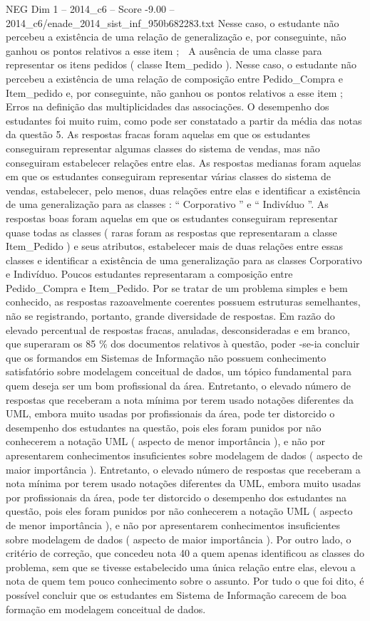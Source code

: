 \begin{textsample}{NEG Dim 1 – 2014\_c6 – Score -9.00 – 2014\_c6/enade\_2014\_sist\_inf\_950b682283.txt}
Nesse caso, o estudante não percebeu a existência de uma relação de generalização e, por conseguinte, não ganhou os pontos relativos a esse item ;  A ausência de uma classe para representar os itens pedidos ( classe Item\_pedido ).
Nesse caso, o estudante não percebeu a existência de uma relação de composição entre Pedido\_Compra e Item\_pedido e, por conseguinte, não ganhou os pontos relativos a esse item ;  Erros na definição das multiplicidades das associações.
O desempenho dos estudantes foi muito ruim, como pode ser constatado a partir da média das notas da questão 5.
As respostas fracas foram aquelas em que os estudantes conseguiram representar algumas classes do sistema de vendas, mas não conseguiram estabelecer relações entre elas.
As respostas medianas foram aquelas em que os estudantes conseguiram representar várias classes do sistema de vendas, estabelecer, pelo menos, duas relações entre elas e identificar a existência de uma generalização para as classes : “ Corporativo ” e “ Indivíduo ”.
As respostas boas foram aquelas em que os estudantes conseguiram representar quase todas as classes ( raras foram as respostas que representaram a classe Item\_Pedido ) e seus atributos, estabelecer mais de duas relações entre essas classes e identificar a existência de uma generalização para as classes Corporativo e Indivíduo.
Poucos estudantes representaram a composição entre Pedido\_Compra e Item\_Pedido.
Por se tratar de um problema simples e bem conhecido, as respostas razoavelmente coerentes possuem estruturas semelhantes, não se registrando, portanto, grande diversidade de respostas.
Em razão do elevado percentual de respostas fracas, anuladas, desconsideradas e em branco, que superaram os 85 \% dos documentos relativos à questão, poder -se-ia concluir que os formandos em Sistemas de Informação não possuem conhecimento satisfatório sobre modelagem conceitual de dados, um tópico fundamental para quem deseja ser um bom profissional da área.
Entretanto, o elevado número de respostas que receberam a nota mínima por terem usado notações diferentes da UML, embora muito usadas por profissionais da área, pode ter distorcido o desempenho dos estudantes na questão, pois eles foram punidos por não conhecerem a notação UML ( aspecto de menor importância ), e não por apresentarem conhecimentos insuficientes sobre modelagem de dados ( aspecto de maior importância ).
Entretanto, o elevado número de respostas que receberam a nota mínima por terem usado notações diferentes da UML, embora muito usadas por profissionais da área, pode ter distorcido o desempenho dos estudantes na questão, pois eles foram punidos por não conhecerem a notação UML ( aspecto de menor importância ), e não por apresentarem conhecimentos insuficientes sobre modelagem de dados ( aspecto de maior importância ).
Por outro lado, o critério de correção, que concedeu nota 40 a quem apenas identificou as classes do problema, sem que se tivesse estabelecido uma única relação entre elas, elevou a nota de quem tem pouco conhecimento sobre o assunto.
Por tudo o que foi dito, é possível concluir que os estudantes em Sistema de Informação carecem de boa formação em modelagem conceitual de dados.


\end{textsample}
